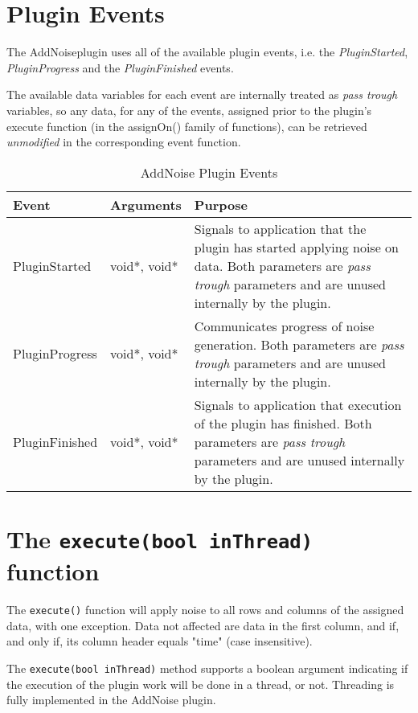 \section{Plugin Events}
The AddNoiseplugin uses all of the available plugin events, i.e. the \emph{PluginStarted}, \emph{PluginProgress} and the \emph{PluginFinished} events.

The available data variables for each event are internally treated as \emph{pass trough} variables, so any data, for any of the events, assigned prior to
the plugin's execute function (in the assignOn() family of functions), can be retrieved \emph{unmodified} in the corresponding event function.
\begin{table}[ht]
\centering %
\begin{tabular}{l l p{7.5cm}} %

Event & Arguments & Purpose \\ [0.5ex] %
\hline %
\hline %
PluginStarted  	& 	void*, void*  & Signals to application that the plugin has started applying noise on data. Both parameters are \emph{pass trough} parameters and are unused internally by the plugin.\\[0.5ex]
PluginProgress	& 	void*, void*  & Communicates progress of noise generation. Both parameters are \emph{pass trough} parameters and are unused internally by the plugin. \\[0.5ex]
PluginFinished	& 	void*, void*  & Signals to application that execution of the plugin has finished. Both parameters are \emph{pass trough} parameters and are unused internally by the plugin.\\

\hline %
\end{tabular}
\caption{AddNoise Plugin Events}
\label{table:AddNoisePluginEvents}
\end{table}

\section{The \texttt{execute(bool inThread)} function}
The \verb|execute()| function will apply noise to all rows and columns of the assigned data, with one exception. Data not affected are data in the first column, and if, and only if, its column header equals "time" (case insensitive).

The \verb|execute(bool inThread)| method supports a boolean argument indicating if the execution of the plugin work will be done in a thread, or not. Threading is fully implemented in the AddNoise plugin.

